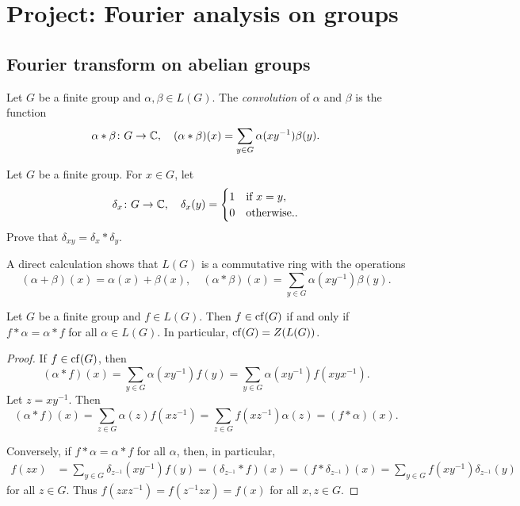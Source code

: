 \section{Project: Fourier analysis on groups}

\subsection{Fourier transform on abelian groups}

\begin{definition}
	Let $G$ be a finite group and $\alpha,\beta\in L(G)$. The \emph{convolution} of $\alpha$ and 
    $\beta$ is the function 
	\[
	\alpha*\beta\colon G\to\mathbb{C},\quad
	(\alpha*\beta)(x)=\sum_{y\in G}\alpha(xy^{-1})\beta(y).
	\]
\end{definition}

\begin{exercise}
	\label{xca:delta}
	Let $G$ be a finite group. For $x\in G$, let 
    \[
	\delta_x\colon G\to\mathbb{C},\quad
	\delta_x(y)=\begin{cases}
		1 & \text{if $x=y$},\\
		0 & \text{otherwise.}.
	\end{cases}
	\]
	Prove that $\delta_{xy}=\delta_x*\delta_y$.
\end{exercise}

A direct calculation shows that $L(G)$ is a 
commutative ring with the operations
	\[
	(\alpha+\beta)(x)=\alpha(x)+\beta(x),\quad
	(\alpha*\beta)(x)=\sum_{y\in G}\alpha(xy^{-1})\beta(y).
	\]

\begin{proposition}
	Let $G$ be a finite group and $f\in L(G)$. Then 
    $f\in\operatorname{cf}(G)$ if and only if $f*\alpha=\alpha*f$ 
    for all $\alpha\in L(G)$. In particular, 
    $\operatorname{cf}(G)=Z(L(G))$. 
\end{proposition}

\begin{proof}
  If $f\in\operatorname{cf}(G)$, then 
  \[
    (\alpha*f)(x)=\sum_{y\in G}\alpha(xy^{-1})f(y)=\sum_{y\in G}\alpha(xy^{-1})f(xyx^{-1}).
  \]
  Let $z=xy^{-1}$. Then 
  \[
    (\alpha*f)(x)=\sum_{z\in G}\alpha(z)f(xz^{-1})=\sum_{z\in G}f(xz^{-1})\alpha(z)=(f*\alpha)(x).
  \]
  
  Conversely, if $f*\alpha=\alpha*f$ for all $\alpha$, 
  then, in particular, 
  \begin{align*}
    f(zx)&=\sum_{y\in G}\delta_{z^{-1}}(xy^{-1})f(y)=(\delta_{z^{-1}}*f)(x)
    =(f*\delta_{z^{-1}})(x)=\sum_{y\in G}f(xy^{-1})\delta_{z^{-1}}(y)
  \end{align*}
  for all $z\in G$. Thus $f(zxz^{-1})=f(z^{-1}zx)=f(x)$ for all
  $x,z\in
  G$.
\end{proof}

